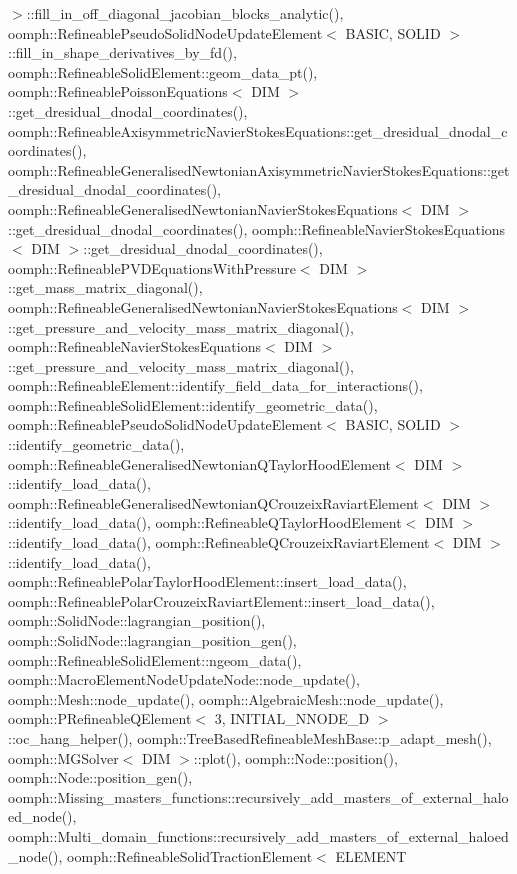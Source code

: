 $>$\+::fill\+\_\+in\+\_\+off\+\_\+diagonal\+\_\+jacobian\+\_\+blocks\+\_\+analytic(), oomph\+::\+Refineable\+Pseudo\+Solid\+Node\+Update\+Element$<$ B\+A\+S\+I\+C, S\+O\+L\+I\+D $>$\+::fill\+\_\+in\+\_\+shape\+\_\+derivatives\+\_\+by\+\_\+fd(), oomph\+::\+Refineable\+Solid\+Element\+::geom\+\_\+data\+\_\+pt(), oomph\+::\+Refineable\+Poisson\+Equations$<$ D\+I\+M $>$\+::get\+\_\+dresidual\+\_\+dnodal\+\_\+coordinates(), oomph\+::\+Refineable\+Axisymmetric\+Navier\+Stokes\+Equations\+::get\+\_\+dresidual\+\_\+dnodal\+\_\+coordinates(), oomph\+::\+Refineable\+Generalised\+Newtonian\+Axisymmetric\+Navier\+Stokes\+Equations\+::get\+\_\+dresidual\+\_\+dnodal\+\_\+coordinates(), oomph\+::\+Refineable\+Generalised\+Newtonian\+Navier\+Stokes\+Equations$<$ D\+I\+M $>$\+::get\+\_\+dresidual\+\_\+dnodal\+\_\+coordinates(), oomph\+::\+Refineable\+Navier\+Stokes\+Equations$<$ D\+I\+M $>$\+::get\+\_\+dresidual\+\_\+dnodal\+\_\+coordinates(), oomph\+::\+Refineable\+P\+V\+D\+Equations\+With\+Pressure$<$ D\+I\+M $>$\+::get\+\_\+mass\+\_\+matrix\+\_\+diagonal(), oomph\+::\+Refineable\+Generalised\+Newtonian\+Navier\+Stokes\+Equations$<$ D\+I\+M $>$\+::get\+\_\+pressure\+\_\+and\+\_\+velocity\+\_\+mass\+\_\+matrix\+\_\+diagonal(), oomph\+::\+Refineable\+Navier\+Stokes\+Equations$<$ D\+I\+M $>$\+::get\+\_\+pressure\+\_\+and\+\_\+velocity\+\_\+mass\+\_\+matrix\+\_\+diagonal(), oomph\+::\+Refineable\+Element\+::identify\+\_\+field\+\_\+data\+\_\+for\+\_\+interactions(), oomph\+::\+Refineable\+Solid\+Element\+::identify\+\_\+geometric\+\_\+data(), oomph\+::\+Refineable\+Pseudo\+Solid\+Node\+Update\+Element$<$ B\+A\+S\+I\+C, S\+O\+L\+I\+D $>$\+::identify\+\_\+geometric\+\_\+data(), oomph\+::\+Refineable\+Generalised\+Newtonian\+Q\+Taylor\+Hood\+Element$<$ D\+I\+M $>$\+::identify\+\_\+load\+\_\+data(), oomph\+::\+Refineable\+Generalised\+Newtonian\+Q\+Crouzeix\+Raviart\+Element$<$ D\+I\+M $>$\+::identify\+\_\+load\+\_\+data(), oomph\+::\+Refineable\+Q\+Taylor\+Hood\+Element$<$ D\+I\+M $>$\+::identify\+\_\+load\+\_\+data(), oomph\+::\+Refineable\+Q\+Crouzeix\+Raviart\+Element$<$ D\+I\+M $>$\+::identify\+\_\+load\+\_\+data(), oomph\+::\+Refineable\+Polar\+Taylor\+Hood\+Element\+::insert\+\_\+load\+\_\+data(), oomph\+::\+Refineable\+Polar\+Crouzeix\+Raviart\+Element\+::insert\+\_\+load\+\_\+data(), oomph\+::\+Solid\+Node\+::lagrangian\+\_\+position(), oomph\+::\+Solid\+Node\+::lagrangian\+\_\+position\+\_\+gen(), oomph\+::\+Refineable\+Solid\+Element\+::ngeom\+\_\+data(), oomph\+::\+Macro\+Element\+Node\+Update\+Node\+::node\+\_\+update(), oomph\+::\+Mesh\+::node\+\_\+update(), oomph\+::\+Algebraic\+Mesh\+::node\+\_\+update(), oomph\+::\+P\+Refineable\+Q\+Element$<$ 3, I\+N\+I\+T\+I\+A\+L\+\_\+\+N\+N\+O\+D\+E\+\_\+D $>$\+::oc\+\_\+hang\+\_\+helper(), oomph\+::\+Tree\+Based\+Refineable\+Mesh\+Base\+::p\+\_\+adapt\+\_\+mesh(), oomph\+::\+M\+G\+Solver$<$ D\+I\+M $>$\+::plot(), oomph\+::\+Node\+::position(), oomph\+::\+Node\+::position\+\_\+gen(), oomph\+::\+Missing\+\_\+masters\+\_\+functions\+::recursively\+\_\+add\+\_\+masters\+\_\+of\+\_\+external\+\_\+haloed\+\_\+node(), oomph\+::\+Multi\+\_\+domain\+\_\+functions\+::recursively\+\_\+add\+\_\+masters\+\_\+of\+\_\+external\+\_\+haloed\+\_\+node(), oomph\+::\+Refineable\+Solid\+Traction\+Element$<$ E\+L\+E\+M\+E\+N\+T 